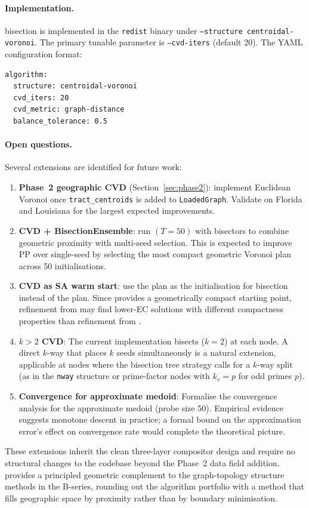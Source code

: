 \paragraph{Implementation.}
\cvd{} bisection is implemented in the \texttt{redist} binary under
\texttt{--structure centroidal-voronoi}.
The primary tunable parameter is \texttt{--cvd-iters} (default 20).
The YAML configuration format:
\begin{verbatim}
algorithm:
  structure: centroidal-voronoi
  cvd_iters: 20
  cvd_metric: graph-distance
  balance_tolerance: 0.5
\end{verbatim}

\paragraph{Open questions.}
Several extensions are identified for future work:
\begin{enumerate}
\item \textbf{Phase~2 geographic CVD} (Section~\ref{sec:phase2}): implement
  Euclidean Voronoi once \texttt{tract\_centroids} is added to
  \texttt{LoadedGraph}.
  Validate on Florida and Louisiana for the largest expected improvements.

\item \textbf{CVD + BisectionEnsemble}: run \be{}$(T=50)$ with \cvd{}
  bisectors to combine geometric proximity with multi-seed selection.
  This is expected to improve PP over single-seed \cvd{} by selecting
  the most compact geometric Voronoi plan across 50 initialisations.

\item \textbf{CVD as SA warm start}: use the \cvd{} plan as the
  initialisation for \sa{} bisection instead of the \metis{} plan.
  Since \cvd{} provides a geometrically compact starting point, \sa{}
  refinement from \cvd{} may find lower-EC solutions with different
  compactness properties than \sa{} refinement from \metis{}.

\item \textbf{$k > 2$ CVD}: The current implementation bisects ($k=2$)
  at each node.
  A direct $k$-way \cvd{} that places $k$ seeds simultaneously is a natural
  extension, applicable at nodes where the bisection tree strategy calls for
  a $k$-way split (as in the \texttt{nway} structure or prime-factor nodes
  with $k_v = p$ for odd primes $p$).

\item \textbf{Convergence for approximate medoid}: Formalise the convergence
  analysis for the approximate medoid (probe size 50).
  Empirical evidence suggests monotone descent in practice; a formal bound
  on the approximation error's effect on convergence rate would complete
  the theoretical picture.
\end{enumerate}

These extensions inherit the clean three-layer compositor design and require
no structural changes to the codebase beyond the Phase~2 data field addition.
\cvd{} provides a principled geometric complement to the graph-topology
structure methods in the B-series, rounding out the algorithm portfolio
with a method that fills geographic space by proximity rather than by
boundary minimisation.
